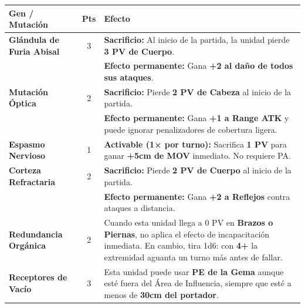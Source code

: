 \begin{tcolorbox}[enhanced, colback=white, colframe=VoidBlack,
    title={\large \textbf{CATÁLOGO DE MUTACIONES — NIVEL BÁSICO}},
    boxed title style={colback=VoidPurple, coltext=white}]
\begin{tabularx}{\linewidth}{l|c|X}
\rowcolor{BloodPurple!20} \textbf{Gen / Mutación} & \textbf{Pts} & \textbf{Efecto} \\ \hline

\textbf{Glándula de Furia Abisal} & 3 &
\textbf{Sacrificio:} Al inicio de la partida, la unidad pierde \textbf{3 PV de Cuerpo}. \\
& & \textbf{Efecto permanente:} Gana \textbf{+2 al daño de todos sus ataques}. \\ \hline

\textbf{Mutación Óptica} & 2 &
\textbf{Sacrificio:} Pierde \textbf{2 PV de Cabeza} al inicio de la partida. \\
& & \textbf{Efecto permanente:} Gana \textbf{+1 a Range ATK} y puede ignorar penalizadores de cobertura ligera. \\ \hline

\textbf{Espasmo Nervioso} & 1 &
\textbf{Activable (1× por turno):} Sacrifica \textbf{1 PV} para ganar \textbf{+5cm de MOV} inmediato. No requiere PA. \\ \hline

\textbf{Corteza Refractaria} & 2 &
\textbf{Sacrificio:} Pierde \textbf{2 PV de Cuerpo} al inicio de la partida. \\
& & \textbf{Efecto permanente:} Gana \textbf{+2 a Reflejos} contra ataques a distancia. \\ \hline

\textbf{Redundancia Orgánica} & 2 &
Cuando esta unidad llega a 0 PV en \textbf{Brazos o Piernas}, no aplica el efecto de incapacitación inmediata. En cambio, tira 1d6: con \textbf{4+} la extremidad aguanta un turno más antes de fallar. \\ \hline

\textbf{Receptores de Vacío} & 3 &
Esta unidad puede usar \textbf{PE de la Gema} aunque esté fuera del Área de Influencia, siempre que esté a menos de \textbf{30cm del portador}. \\ \hline

\end{tabularx}
\end{tcolorbox}

\vspace{0.4cm}

